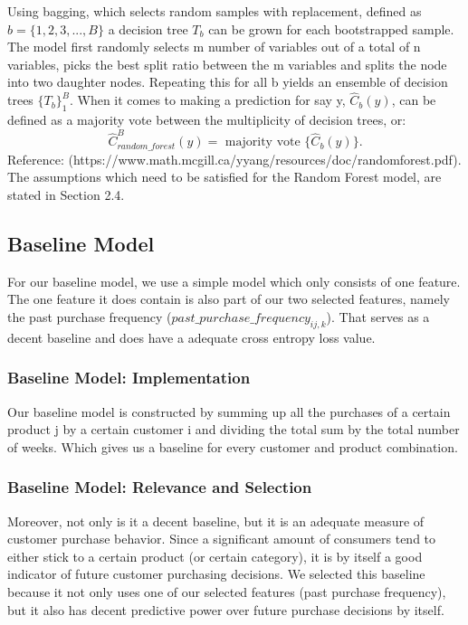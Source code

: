 Using bagging, which selects random samples with replacement, defined as $b =
\{1, 2, 3, ..., B\}$ a decision tree $T_{b}$ can be grown for each bootstrapped
sample. The model first randomly selects m number of variables out of a total of
n variables, picks the best split ratio between the m variables and splits the
node into two daughter nodes. Repeating this for all b yields an ensemble of
decision trees $\{T_{b}\}^{B}_{1}$. When it comes to making a prediction for say
y, $\hat{C}_{b}(y)$, can be defined as a majority vote between the multiplicity of decision
trees, or:
\begin{equation}
    \hat{C}_{random\_forest}^{B}(y) = \text{ majority vote }
\{\hat{C}_{b}(y)\}.
\end{equation}
Reference: (https://www.math.mcgill.ca/yyang/resources/doc/randomforest.pdf). \\
The assumptions which need to be satisfied for the Random Forest model, are
stated in Section 2.4.

\subsection{Baseline Model}
For our baseline model, we use a simple model which only consists of one
feature. The one feature it does contain is also part of our two selected
features, namely the past purchase frequency
($past\_purchase\_frequency_{ij,k}$). That serves as a decent baseline and does
have a adequate cross entropy loss value.

\subsubsection{Baseline Model: Implementation}
Our baseline model is constructed by summing up all the purchases of a certain
product j by a certain customer i and dividing the total sum by the total number
of weeks. Which gives us a baseline for every customer and product combination.

\subsubsection{Baseline Model: Relevance and Selection}
Moreover, not only is it a decent baseline, but it is an adequate measure of
customer purchase behavior. Since a significant amount of consumers tend to
either stick to a certain product (or certain category), it is by itself a good
indicator of future customer purchasing decisions. We selected this baseline
because it not only uses one of our selected features (past purchase frequency),
but it also has decent predictive power over future purchase decisions by
itself.

